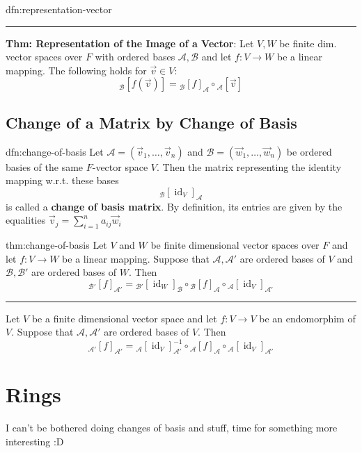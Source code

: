 \documentclass[landscape, 8pt]{extarticle}
\DeclareMathOperator{\id}{id}
\begin{document}
\begin{multicols}{3}
\begin{dfn}{dfn:representation-vector}{}
    \noindent\rule{\textwidth}{0.2pt}
    \textbf{Thm: Representation of the Image of a Vector}: Let $V,W$ be finite dim. vector spaces over $F$ with ordered bases $\mathcal{A}, \mathcal{B}$ and let $f : V \to W$ be a linear mapping. The following holds for $\vec{v}\in V$:
    \[{}_{\mathcal{B}}[f(\vec{v})] = {}_{\mathcal{B}}[f]_{\mathcal{A}}\circ {}_{\mathcal{A}}[\vec{v}]\]
\end{dfn}

\subsection{Change of a Matrix by Change of Basis}

\begin{dfn}{dfn:change-of-basis}{}
    Let $\mathcal{A} = (\vec{v}_{1},\dots,\vec{v}_{n})$ and $\mathcal{B} = (\vec{w}_{1},\dots,\vec{w}_{n})$ be ordered basies of the same $F$-vector space $V$. Then the matrix representing the identity mapping w.r.t. these bases
    \[{}_{\mathcal{B}}[\id_{V}]_{\mathcal{A}}\]
    is called a \textbf{change of basis matrix}. By definition, its entries are given by the equalities $\vec{v}_{j} = \sum_{i = 1}^{n} a_{ij}\vec{w}_{i}$
\end{dfn}

\begin{thm}{thm:change-of-basis}{}
    Let $V$ and $W$ be finite dimensional vector spaces over $F$ and let $f : V \to W$ be a linear mapping. Suppose that $\mathcal{A}, \mathcal{A}'$ are ordered bases of $V$ and $\mathcal{B}, \mathcal{B}'$ are ordered bases of $W$. Then
    \[{}_{\mathcal{B}'}[f]_{\mathcal{A}'} = {}_{\mathcal{B}'}[\id_{W}]_{\mathcal{B}} \circ {}_{\mathcal{B}}[f]_{\mathcal{A}} \circ {}_{\mathcal{A}}[\id_{V}]_{\mathcal{A}'}\]

    \noindent\rule{\textwidth}{0.2pt}
    Let $V$ be a finite dimensional vector space and let $f : V \to V$ be an endomorphim of $V$. Suppose that $\mathcal{A}, \mathcal{A}'$ are ordered bases of $V$. Then
    \[{}_{\mathcal{A}'}[f]_{\mathcal{A}'} = {}_{\mathcal{A}}[\id_{V}]_{\mathcal{A}'}^{-1} \circ {}_{\mathcal{A}}[f]_{\mathcal{A}} \circ {}_{\mathcal{A}}[\id_{V}]_{\mathcal{A}'}\]
\end{thm}






\newpage

\section{Rings}
I can't be bothered doing changes of basis and stuff, time for something more interesting :D 


\end{multicols}
\end{document}
